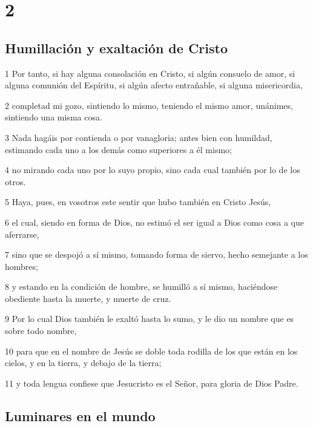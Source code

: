 \chapter{2}

\section*{Humillación y exaltación de Cristo}

\par 1 Por tanto, si hay alguna consolación en Cristo, si algún consuelo de amor, si alguna comunión del Espíritu, si algún afecto entrañable, si alguna misericordia,
\par 2 completad mi gozo, sintiendo lo mismo, teniendo el mismo amor, unánimes, sintiendo una misma cosa.
\par 3 Nada hagáis por contienda o por vanagloria; antes bien con humildad, estimando cada uno a los demás como superiores a él mismo;
\par 4 no mirando cada uno por lo suyo propio, sino cada cual también por lo de los otros.
\par 5 Haya, pues, en vosotros este sentir que hubo también en Cristo Jesús,
\par 6 el cual, siendo en forma de Dios, no estimó el ser igual a Dios como cosa a que aferrarse,
\par 7 sino que se despojó a sí mismo, tomando forma de siervo, hecho semejante a los hombres;
\par 8 y estando en la condición de hombre, se humilló a sí mismo, haciéndose obediente hasta la muerte, y muerte de cruz.
\par 9 Por lo cual Dios también le exaltó hasta lo sumo, y le dio un nombre que es sobre todo nombre,
\par 10 para que en el nombre de Jesús se doble toda rodilla de los que están en los cielos, y en la tierra, y debajo de la tierra;
\par 11 y toda lengua confiese que Jesucristo es el Señor, para gloria de Dios Padre.

\section*{Luminares en el mundo}

